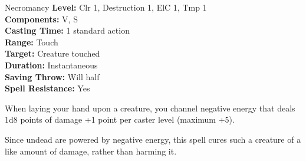 {Necromancy}
{
	\textbf{Level:}
	Clr 1, Destruction 1, ElC 1, Tmp 1\\
	\textbf{Components:}
	V, S\\
	\textbf{Casting Time:}
	1 standard action\\
	\textbf{Range:}
	Touch\\
	\textbf{Target:}
	Creature touched\\
	\textbf{Duration:}
	Instantaneous\\
	\textbf{Saving Throw:}
	Will half\\
	\textbf{Spell Resistance:}
	Yes\\
}
{
	When laying your hand upon a creature, you channel negative energy that deals 1d8 points of damage +1 point per caster level (maximum +5).

	Since undead are powered by negative energy, this spell cures such a creature of a like amount of damage, rather than harming it.

}
